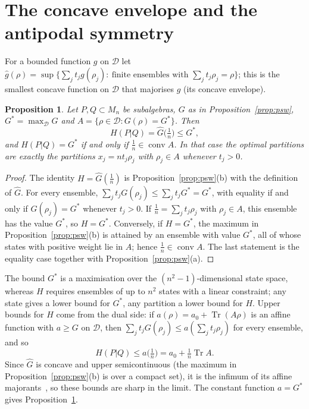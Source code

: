 \documentclass[11pt]{article}
\DeclareMathOperator{\Tr}{Tr}
\DeclareMathOperator{\conv}{conv}
\newcommand{\D}{\mathcal{D}}
\theoremstyle{plain}
\newtheorem{proposition}[theorem]{Proposition}
\theoremstyle{definition}
\theoremstyle{remark}
\begin{document}
\section{The concave envelope and the antipodal symmetry}\label{sec:envelope}

For a bounded function $g$ on $\D$ let $\hat g(\rho)=\sup\{\sum_jt_jg(\rho_j):\ \text{finite ensembles with }\sum_jt_j\rho_j=\rho\}$;
this is the smallest concave function on $\D$ that majorises $g$ (its concave envelope).

\begin{proposition}\label{prop:envelope}
Let $P,Q\subset M_n$ be subalgebras, $G$ as in Proposition~\ref{prop:psw}, $G^*=\max_\D G$ and $A=\{\rho\in\D:G(\rho)=G^*\}$.
Then
\[
  H(P|Q)=\hat G\bigl(\tfrac1n\bigr)\le G^*,
\]
and $H(P|Q)=G^*$ if and only if $\frac1n\in\conv A$. In that case the optimal partitions are exactly the partitions
$x_j=nt_j\rho_j$ with $\rho_j\in A$ whenever $t_j>0$.
\end{proposition}
\begin{proof}
The identity $H=\hat G(\frac1n)$ is Proposition~\ref{prop:psw}(b) with the definition of $\hat G$. For every ensemble,
$\sum_jt_jG(\rho_j)\le\sum_jt_jG^*=G^*$, with equality if and only if $G(\rho_j)=G^*$ whenever $t_j>0$. If $\frac1n=\sum_jt_j\rho_j$
with $\rho_j\in A$, this ensemble has the value $G^*$, so $H=G^*$. Conversely, if $H=G^*$, the maximum in
Proposition~\ref{prop:psw}(b) is attained by an ensemble with value $G^*$, all of whose states with positive weight lie in
$A$; hence $\frac1n\in\conv A$. The last statement is the equality case together with Proposition~\ref{prop:psw}(a).
\end{proof}

The bound $G^*$ is a maximisation over the $(n^2-1)$-dimensional state space, whereas $H$ requires ensembles of up to $n^2$
states with a linear constraint; any state gives a lower bound for $G^*$, any partition a lower bound for $H$. Upper bounds
for $H$ come from the dual side: if $a(\rho)=a_0+\Tr(A\rho)$ is an affine function with $a\ge G$ on $\D$, then
$\sum_jt_jG(\rho_j)\le a(\sum_jt_j\rho_j)$ for every ensemble, and so
\begin{equation}\label{eq:dual}
  H(P|Q)\le a\bigl(\tfrac1n\bigr)=a_0+\tfrac1n\Tr A .
\end{equation}
Since $\hat G$ is concave and upper semicontinuous (the maximum in Proposition~\ref{prop:psw}(b) is over a compact set),
it is the infimum of its affine majorants~\cite[Section~12]{rockafellar1970}, so these bounds are sharp in the limit. The
constant function $a=G^*$ gives Proposition~\ref{prop:envelope}.
\end{document}
